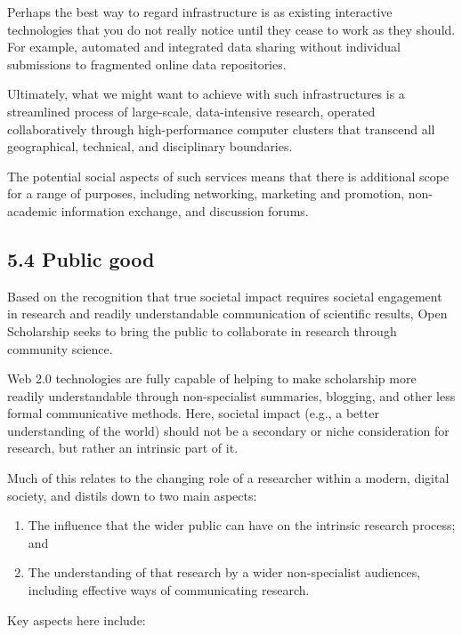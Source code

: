 Perhaps the best way to regard infrastructure is as existing interactive
technologies that you do not really notice until they cease to work as
they should. For example, automated and integrated data sharing without
individual submissions to fragmented online data repositories.

Ultimately, what we might want to achieve with such infrastructures is a
streamlined process of large-scale, data-intensive research, operated
collaboratively through high-performance computer clusters that
transcend all geographical, technical, and disciplinary boundaries.

The potential social aspects of such services means that there is
additional scope for a range of purposes, including networking,
marketing and promotion, non-academic information exchange, and
discussion forums.

\subsection{5.4 Public good }\label{public-good}

Based on the recognition that true societal impact requires societal
engagement in research and readily understandable communication of
scientific results, Open Scholarship seeks to bring the public to
collaborate in research through community science.

Web 2.0 technologies are fully capable of helping to make scholarship
more readily understandable through non-specialist summaries, blogging,
and other less formal communicative methods. Here, societal impact
(e.g., a better understanding of the world) should not be a secondary or
niche consideration for research, but rather an intrinsic part of it.

Much of this relates to the changing role of a researcher within a
modern, digital society, and distils down to two main aspects:

\begin{enumerate}
\def\labelenumi{\arabic{enumi}.}
\item
  The influence that the wider public can have on the intrinsic research
  process; and
\item
  The understanding of that research by a wider non-specialist
  audiences, including effective ways of communicating research.
\end{enumerate}

Key aspects here include:

